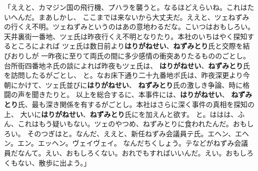 \documentclass[
a4paper,
10pt,
book]
{tarticle}
\begin{document}
「ええと、カマジン国の飛行機、プハラを襲うと。なるほどえらいね。これはたいへんだ。まあしかし、
ここまでは来ないから大丈夫だ。ええと、ツェねずみの行くえ不明。ツェねずみというのはあの意地わるだな。こいつはおもしろい。\\
\indent 天井裏街一番地、ツェ氏は昨夜行くえ不明となりたり。本社のいちはやく探知するところによれば
ツェ氏は数日前より\textbf{はりがねせい}、\textbf{ねずみとり}氏と交際を結びおりしが
一昨夜に至りて両氏の間に多少感情の衝突ありたるもののごとし。台所街四番地ネ氏の談によれば昨夜もツェ氏は、
\textbf{はりがねせい}、\textbf{ねずみとり}氏を訪問したるがごとし、
と。なお床下通り二十九番地ポ氏は、昨夜深更より今朝にかけて、ツェ氏並びに\textbf{はりがねせい}、
\textbf{ねずみとり}氏の激しき争論、時に格闘の声を聞きたりと。
以上を総合するに、本事件には、\textbf{はりがねせい}、
\textbf{ねずみとり}氏、最も深き関係を有するがごとし。本社はさらに深く事件の真相を探知の上、
大いに\textbf{はりがねせい}、\textbf{ねずみとり}氏にを加えんと欲す。
と。ははは、ふん、これはもう疑いもない。ツェのやつめ、ねずみとりに食われたんだ。おもしろい。
そのつぎはと。なんだ、ええと、新任ねずみ会議員テ氏。エヘン、エヘン。エン。エッヘン。ヴェイヴェイ。
なんだちくしょう。テなどがねずみ会議員だなんて。えい、おもしろくない。おれでもすればいいんだ。えい。おもしろくもない、散歩に出よう。」\\
\end{document}
